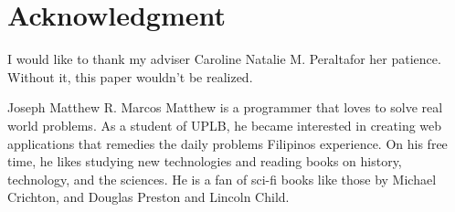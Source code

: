 \documentclass[journal]{./IEEE/IEEEtran}
\newcommand{\ADVISEE}{Joseph Matthew R. Marcos}
\newcommand{\ADVISER}{Caroline Natalie M. Peralta}
\begin{document}
\section*{Acknowledgment}
I would like to thank my adviser \ADVISER for her patience. Without it, this paper wouldn't be realized.
\begin{biography}{\ADVISEE}
Matthew is a programmer that loves to solve real world problems. As a student of UPLB, he became interested in creating web applications that remedies the daily problems Filipinos experience. On his free time, he likes studying new technologies and reading books on history, technology, and the sciences. He is a fan of sci-fi books like those by Michael Crichton, and Douglas Preston and Lincoln Child.
\end{biography}


\newpage
% 



\newpage
\appendices
\end{document}
